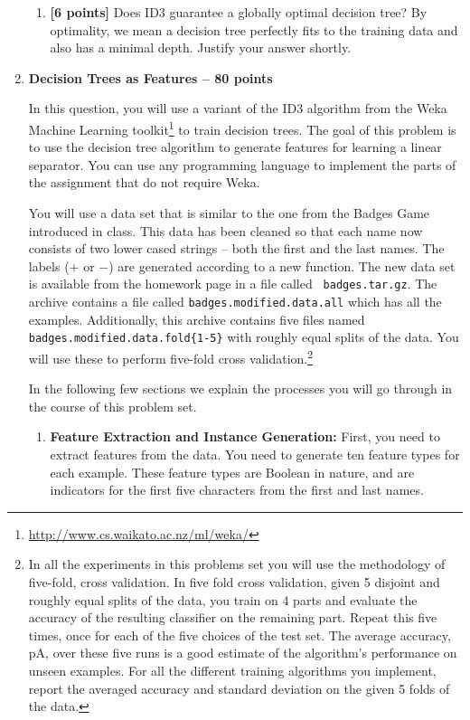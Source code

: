 \begin{enumerate}
\begin{enumerate}
  \item \textbf{[6 points]} Does ID3 guarantee a globally optimal decision tree? By optimality, we mean a decision tree perfectly fits to the training data and also has a minimal depth. Justify your answer shortly.
  \end{enumerate}

\item \textbf{Decision Trees as Features -- 80 points}

In this question, you will use a variant of the ID3 algorithm from the
Weka Machine Learning
toolkit\footnote{\url{http://www.cs.waikato.ac.nz/ml/weka/}} to train
decision trees. The goal of this problem is to use the decision tree
algorithm to generate features for learning a linear separator.  You
can use any programming language to implement the parts of the
assignment that do not require Weka.

You will use a data set that is similar to the one from the Badges
Game introduced in class. This data has been cleaned so that each name now
consists of two lower cased strings -- both the first and the last names.
The labels ($+$ or $-$) are generated according to a new function. 
The new data set is available from the homework page in a file called {\tt
badges.tar.gz}. The archive contains a file called {\tt badges.modified.data.all} which 
has all the examples.  Additionally, this archive contains five files
named {\tt badges.modified.data.fold\{1-5\}} with roughly equal splits
of the data. You will use these to perform five-fold cross validation.\footnote{In all the experiments in this problems set you will use the methodology of five-fold, cross validation. In five fold cross validation, given 5 disjoint and roughly equal splits of the data, you train on 4 parts and evaluate the accuracy of the resulting classifier on the remaining part. Repeat this five times, once for each of the five choices of the test set. The average accuracy, pA, over these five runs is a good estimate of the algorithm’s performance on unseen examples. For all the different training algorithms you implement, report the averaged accuracy and standard deviation on the given 5 folds of the data.}

In the following few sections we explain the processes you will go through in the course
of this problem set.
  
  
  \begin{enumerate}
  \item {\bf Feature Extraction and Instance Generation:} First, you need to extract
features from the data. You need to generate ten feature types for each example.
These feature types are Boolean in nature, and are indicators for the first five
characters from the first and last names.


\end{enumerate}
\end{enumerate}
